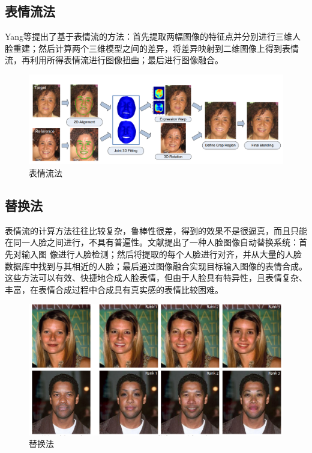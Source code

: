 \documentclass{ctexart}
\begin{document}
\subsection{\hei 表情流法}
Yang等\cite{16}提出了基于表情流的方法：首先提取两幅图像的特征点并分别进行三维人脸重建；然后计算两个三维模型之间的差异，将差异映射到二维图像上得到表情流，再利用所得表情流进行图像扭曲；最后进行图像融合\cite{17}。 
\begin{figure}[htbp]	
	\centering	
	
			\includegraphics[scale=0.3]{6.png}
	\caption{表情流法}
\end{figure}
\subsection{\hei 替换法}
表情流的计算方法往往比较复杂，鲁棒性很差，得到的效果不是很逼真，而且只能在同一人脸之间进行，不具有普遍性。文献\cite{18,19}提出了一种人脸图像自动替换系统：首先对输入图 像进行人脸检测；然后将提取的每个人脸进行对齐，并从大量的人脸数据库中找到与其相近的人脸；最后通过图像融合实现目标输入图像的表情合成。这些方法可以有效、快捷地合成人脸表情，但由于人脸具有特异性，且表情复杂、丰富，在表情合成过程中合成具有真实感的表情比较困难。
\begin{figure}[htbp]	
	\centering	
	
			\includegraphics[scale=0.3]{7.png}
	\caption{替换法}
\end{figure}
\end{document}
